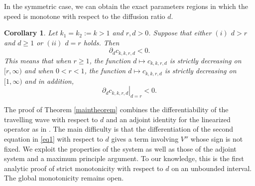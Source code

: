 \documentclass[11pt]{article}
\numberwithin{equation}{section}
\newcommand{\1}{\mathbbm{1}}
\numberwithin{equation}{section}
\newtheorem{corollary}[theorem]{Corollary}
\theoremstyle{definition}
\numberwithin{equation}{section}
\begin{document}
In the symmetric case, we can obtain the exact parameters regions in which the speed is monotone with respect to the diffusion ratio $d$. %
\begin{corollary}\label{corollary1}
Let $k_1=k_2:=k>1$ and $r,d>0$. Suppose that either  $(i)$ $d>r$ and $d\geq 1$ or $(ii)$ $d=r$ holds. Then 
	\begin{equation}\label{eq5a}
	\partial_d c_{k,k,r,d}<0.
	\end{equation}             
This means that when $r\geq1$, the function $d\mapsto c_{k,k,r,d}$ is strictly decreasing on $[r, \infty)$ and when $0<r<1$,  the function $d\mapsto c_{k,k,r,d}$ is strictly decreasing on  $[1,\infty)$ and in addition,
\begin{equation*}
\left. \partial_d c_{k,k,r,d} \right|_{d=r}<0.
\end{equation*}                                                                                          
\end{corollary}
The proof of Theorem \ref{maintheorem} combines the differentiability of the travelling wave with respect to $d$ and an adjoint identity for the linearized operator as in \cite{kan1995}. The main difficulty is that the differentiation of the second equation in \eqref{eq1} with respect to $d$ gives a term involving $V''$ whose sign is not fixed. We exploit the properties of the system as well as those of the adjoint system and a maximum principle argument. To our knowledge, this is the first analytic proof of strict monotonicity with respect to $d$ on an unbounded interval. The global monotonicity remains open. 
\end{document}
